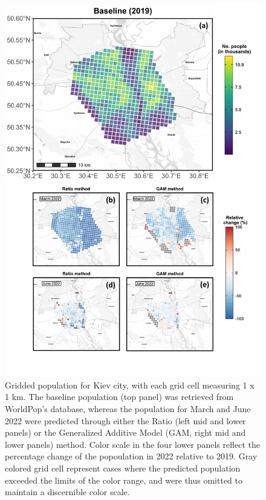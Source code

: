 \documentclass[sn-basic]{sn-jnl}%
\begin{document}
{\begin{appendices}
\begin{figure}[h!]
\begin{center}
\includegraphics[scale = 0.6]{Figures/SM_gridded_predictions_relative.pdf}
\end{center}
\caption{Gridded population for Kiev city, with each grid cell measuring 1 x 1 km. The baseline population (top panel) was retrieved from WorldPop's database, whereas the population for March and June 2022 were predicted through either the Ratio (left mid and lower panels) or the Generalized Additive Model (GAM, right mid and lower panels) method. Color scale in the four lower panels reflect the percentage change of the popoulation in 2022 relative to 2019. Gray colored grid cell represent cases where the predicted population exceeded the limits of the color range, and were thus omitted to maintain a discernible color scale.}
\label{figSM_gridded_pred}
\end{figure}




\end{appendices}}
\end{document}
